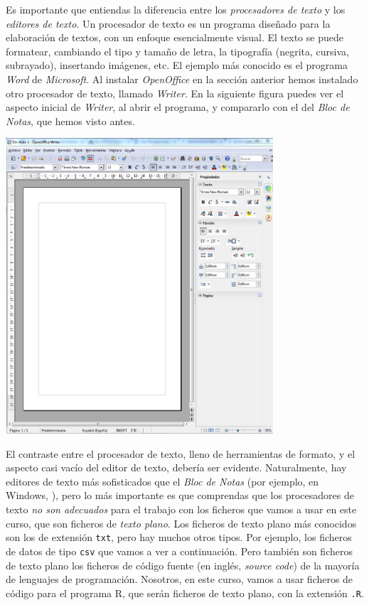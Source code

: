 \documentclass[10pt,a4paper]{article}
\newcounter {cont01}
\begin{document}
Es importante que entiendas la diferencia entre los {\em procesadores de texto} y los {\em editores
de texto}. Un procesador de texto es un programa diseñado para la elaboración de textos, con un
enfoque esencialmente visual. El texto se puede formatear, cambiando el tipo y tamaño de letra,  la
tipografía (negrita, cursiva, subrayado), insertando imágenes, etc.  El ejemplo más conocido es el
programa {\em Word} de {\em Microsoft}. Al instalar {\em OpenOffice} en la sección anterior hemos
instalado otro procesador de texto, llamado {\em Writer}. En la siguiente figura puedes ver el
aspecto inicial de {\em Writer}, al abrir el programa, y compararlo con el del {\em Bloc de Notas},
que hemos visto antes.
    \begin{center}
    \includegraphics[height=11cm]{../fig/Tut00-ProcesadorVsEditor.png}
    \end{center}
El contraste entre el procesador de texto, lleno de herramientas de formato, y el aspecto casi
vacío del editor de texto, debería ser evidente. Naturalmente, hay editores de texto más
sofisticados que el {\em Bloc de Notas} (por ejemplo, en Windows,
), pero lo más importante es que comprendas que los
procesadores de texto {\em no son adecuados} para el trabajo con los ficheros que vamos a usar en
este curso, que son ficheros de {\em texto plano}. Los ficheros de texto plano más conocidos son
los de extensión {\tt txt}, pero hay muchos otros tipos. Por ejemplo, los ficheros de datos de tipo
{\tt csv} que vamos a ver a continuación. Pero también son ficheros de texto plano los ficheros de
{\sf código fuente} (en inglés, {\em source code}) de la mayoría de lenguajes de programación.
Nosotros, en este curso, vamos a usar ficheros de código para el programa R, que serán ficheros de
texto plano, con la extensión {\tt .R}.
\end{document}
